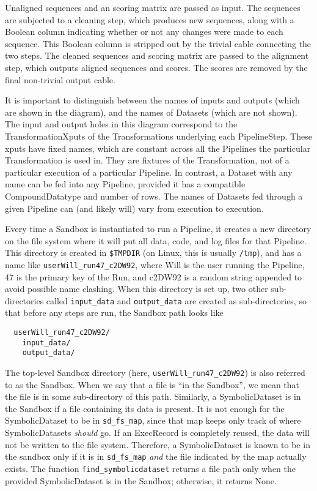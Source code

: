 \documentclass[12pt]{article}
\newcommand{\code}[1]{\texttt{#1}}
\begin{document}
Unaligned sequences and an scoring matrix are passed as input. The sequences
are subjected to a cleaning step, which produces new sequences, along with a
Boolean column indicating whether or not any changes were made to each
sequence. This Boolean column is stripped out by the trivial cable connecting
the two steps. The cleaned sequences and scoring matrix are passed to the
alignment step, which outputs aligned sequences and scores. The scores are
removed by the final non-trivial output cable.

It is important to distinguish between the names of inputs and outputs (which
are shown in the diagram), and the names of Datasets (which are not shown). The
input and output holes in this diagram correspond to the TransformationXputs of
the Transformations underlying each PipelineStep. These xputs have fixed names,
which are constant across all the Pipelines the particular Transformation is
used in. They are fixtures of the Transformation, not of a particular execution
of a particular Pipeline. In contrast, a Dataset with any name can be fed into
any Pipeline, provided it has a compatible CompoundDatatype and number of rows.
The names of Datasets fed through a given Pipeline can (and likely will) vary
from execution to execution.

Every time a Sandbox is instantiated to run a Pipeline, it
creates a new directory on the file system where it will put all data, code,
and log files for that Pipeline. This directory is created in \code{\$TMPDIR}
(on Linux, this is usually \code{/tmp}), and has a name like
\code{userWill\_run47\_c2DW92}, where Will is the user running the Pipeline, 47
is the primary key of the Run, and c2DW92 is a random string appended to avoid
possible name clashing. When this directory is set up, two other
sub-directories called \code{input\_data} and \code{output\_data} are created
as sub-directories, so that before any steps are run, the Sandbox path looks
like
\begin{verbatim}
  userWill_run47_c2DW92/
    input_data/
    output_data/
\end{verbatim}

The top-level Sandbox directory (here, \code{userWill\_run47\_c2DW92}) is also
referred to as the Sandbox. When we say that a file is ``in the Sandbox'', we
mean that the file is in some sub-directory of this path. Similarly, a
SymbolicDataset is in the Sandbox if a file containing its data is present. It
is not enough for the SymbolicDataset to be in \code{sd\_fs\_map}, since that
map keeps only track of where SymbolicDatasets \emph{should} go. If an
ExecRecord is completely reused, the data will not be written to the file
system. Therefore, a SymbolicDataset is known to be in the sandbox only if it
is in \code{sd\_fs\_map} \emph{and} the file indicated by the map actually
exists. The function \code{find\_symbolicdataset} returns a file path only when
the provided SymbolicDataset is in the Sandbox; otherwise, it returns None.
\end{document}
